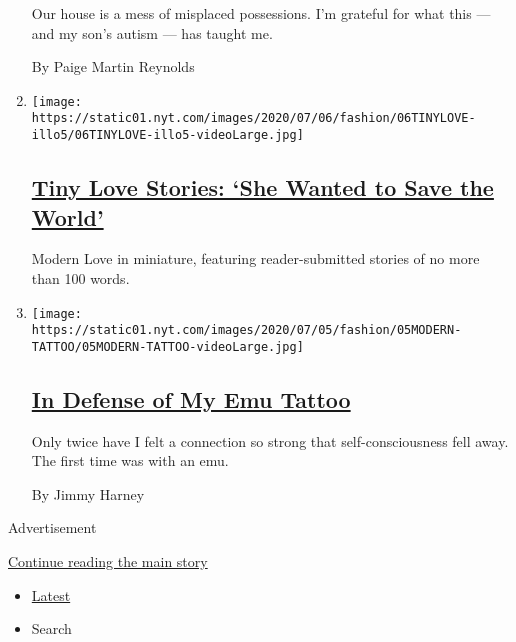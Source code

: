 \begin{enumerate}
  Our house is a mess of misplaced possessions. I'm grateful for what
  this --- and my son's autism --- has taught me.

  By Paige Martin Reynolds
\item
  \texttt{[image: https://static01.nyt.com/images/2020/07/06/fashion/06TINYLOVE-illo5/06TINYLOVE-illo5-videoLarge.jpg]}

  \hypertarget{tiny-love-stories-she-wanted-to-save-the-world}{%
  \subsection{\texorpdfstring{\href{/2020/07/07/style/tiny-modern-love-stories-coronavirus-she-wanted-to-save-the-world.html}{Tiny
  Love Stories: `She Wanted to Save the
  World'}}{Tiny Love Stories: `She Wanted to Save the World'}}\label{tiny-love-stories-she-wanted-to-save-the-world}}

  Modern Love in miniature, featuring reader-submitted stories of no
  more than 100 words.
\item
  \texttt{[image: https://static01.nyt.com/images/2020/07/05/fashion/05MODERN-TATTOO/05MODERN-TATTOO-videoLarge.jpg]}

  \hypertarget{in-defense-of-my-emu-tattoo}{%
  \subsection{\texorpdfstring{\href{/2020/07/03/style/modern-love-in-defense-of-my-emu-tattoo.html}{In
  Defense of My Emu
  Tattoo}}{In Defense of My Emu Tattoo}}\label{in-defense-of-my-emu-tattoo}}

  Only twice have I felt a connection so strong that self-consciousness
  fell away. The first time was with an emu.

  By Jimmy Harney
\end{enumerate}

Advertisement

\protect\hyperlink{after-mid1}{Continue reading the main story}

\begin{itemize}
\tightlist
\item
  \protect\hyperlink{stream-panel}{Latest}
\item
  Search
\end{itemize}

